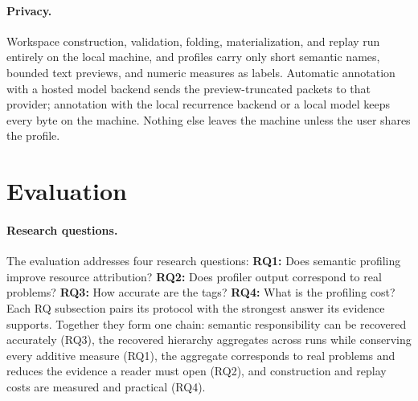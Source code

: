 \documentclass[letterpaper]{article}
\begin{document}
\paragraph{Privacy.}
Workspace construction, validation, folding, materialization, and replay
run entirely on the local machine, and profiles carry only short semantic
names, bounded text previews, and numeric measures as labels. Automatic
annotation with a hosted model backend sends the preview-truncated packets
to that provider; annotation with the local recurrence backend or a local
model keeps every byte on the machine. Nothing else leaves the machine
unless the user shares the profile.

\section{Evaluation}
\label{sec:eval}

\paragraph{Research questions.}
The evaluation addresses four research questions:
\textbf{RQ1:} Does semantic profiling improve resource attribution?
\textbf{RQ2:} Does profiler output correspond to real problems?
\textbf{RQ3:} How accurate are the tags?
\textbf{RQ4:} What is the profiling cost?
Each RQ subsection pairs its protocol with the strongest answer its evidence
supports.
Together they form one chain: semantic responsibility can be recovered
accurately (RQ3), the recovered hierarchy aggregates across runs while
conserving every additive measure (RQ1), the aggregate corresponds to real
problems and reduces the evidence a reader must open (RQ2), and construction
and replay costs are measured and practical (RQ4).
\end{document}
